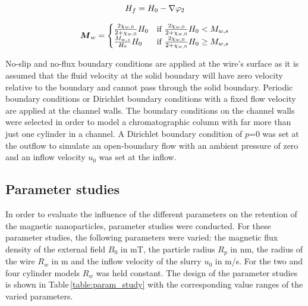 \begin{equation}
\label{eq:loc_mag_field}
\centering
H_{f}=H_{0}-\nabla\varphi_{2}
\end{equation}

\begin{equation}
\label{eq:mag_wire}
\centering
\boldsymbol{M}_{w}= 
                 \begin{cases}
                    \frac{2\chi_{w,0}}{2+\chi_{w,0}}H_{0} & \text{if}\ \frac{2\chi_{w,0}}{2+\chi_{w,0}}H_{0}<M_{w,s} \\
                    \frac{M_{w,s}}{H_{0}}H_{0} & \text{if}\ \frac{2\chi_{w,0}}{2+\chi_{w,0}}H_{0}\geq M_{w,s} \\
                 \end{cases}
\end{equation}

No-slip and no-flux boundary conditions are applied at the wire's surface as it is assumed that the fluid velocity at the solid boundary will have zero velocity relative to the boundary and cannot pass through the solid boundary. Periodic boundary conditions or Dirichlet boundary conditions with a fixed flow velocity are applied at the channel walls. The boundary conditions on the channel walls were selected in order to model a chromatographic column with far more than just one cylinder in a channel. A Dirichlet boundary condition of $p$=0 was set at the outflow to simulate an open-boundary flow with an ambient pressure of zero and an inflow velocity $u_{0}$ was set at the inflow.


\subsection{Parameter studies}
\label{subsec:Param_studies} 
In order to evaluate the influence of the different parameters on the retention of the magnetic nanoparticles, parameter studies were conducted. For these parameter studies, the following parameters were varied: the magnetic flux density of the external field $B_{0}$ in mT, the particle radius $R_{p}$ in nm, the radius of the wire $R_{w}$ in \textmu m and the inflow velocity of the slurry $u_{0}$ in \textmu m/s. For the two and four cylinder models $R_{w}$ was held constant. The design of the parameter studies is shown in Table\,\ref{table:param_study} with the corresponding value ranges of the varied parameters. 

